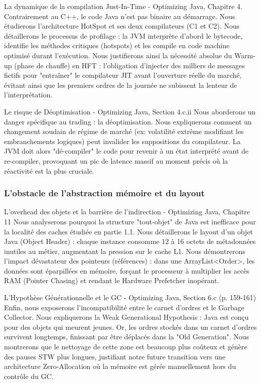 La dynamique de la compilation Just-In-Time - Optimizing Java, Chapitre 4. Contrairement au C++, le code Java n'est pas binaire au démarrage. Nous étudierons l'architecture HotSpot et ses deux compilateurs (C1 et C2). Nous détaillerons le processus de profilage : la JVM interprète d'abord le bytecode, identifie les méthodes critiques (hotspots) et les compile en code machine optimisé durant l'exécution. Nous justifierons ainsi la nécessité absolue du Warm-up (phase de chauffe) en HFT : l'obligation d'injecter des milliers de messages fictifs pour "entraîner" le compilateur JIT avant l'ouverture réelle du marché, évitant ainsi que les premiers ordres de la journée ne subissent la lenteur de l'interprétation.

Le risque de Déoptimisation - Optimizing Java, Section 4.c.ii Nous aborderons un danger spécifique au trading : la déoptimisation. Nous expliquerons comment un changement soudain de régime de marché (ex: volatilité extrême modifiant les embranchements logiques) peut invalider les suppositions du compilateur. La JVM doit alors "dé-compiler" le code pour revenir à un état interprété avant de re-compiler, provoquant un pic de latence massif au moment précis où la réactivité est la plus cruciale.

\subsubsection{L'obstacle de l'abstraction mémoire et du layout}

L'overhead des objets et la barrière de l'indirection - Optimizing Java, Chapitre 11 Nous analyserons pourquoi la structure "tout-objet" de Java est inefficace pour la localité des caches étudiée en partie 1.1. Nous détaillerons le layout d'un objet Java (Object Header) : chaque instance consomme 12 à 16 octets de métadonnées inutiles au métier, augmentant la pression sur le cache L1. Nous démontrerons l'impact dévastateur des pointeurs (références) : dans une ArrayList<Order>, les données sont éparpillées en mémoire, forçant le processeur à multiplier les accès RAM (Pointer Chasing) et rendant le Hardware Prefetcher inopérant.

L'Hypothèse Générationnelle et le GC - Optimizing Java, Section 6.c (p. 159-161) Enfin, nous exposerons l'incompatibilité entre le carnet d'ordres et le Garbage Collector.
Nous expliquerons la Weak Generational Hypothesis : Java est conçu pour des objets qui meurent jeunes. Or, les ordres stockés dans un carnet d'ordres survivent longtemps, finissant par être déplacés dans la "Old Generation". Nous montrerons que le nettoyage de cette zone est beaucoup plus coûteux et génère des pauses STW plus longues, justifiant notre future transition vers une architecture Zero-Allocation où la mémoire est gérée manuellement hors du contrôle du GC.